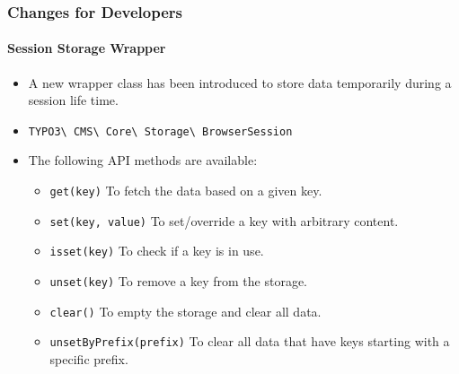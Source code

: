 %

\begin{frame}[fragile]
	\frametitle{Changes for Developers}
	\framesubtitle{Session Storage Wrapper}


	\begin{itemize}
		\item A new wrapper class has been introduced to store data temporarily
			during a session life time.
		\item \texttt{TYPO3\textbackslash
			CMS\textbackslash
			Core\textbackslash
			Storage\textbackslash
			BrowserSession}
		\item The following API methods are available:

			\begin{itemize}\smaller
				\item \texttt{get(key)}\newline
					To fetch the data based on a given key.
				\item \texttt{set(key, value)}\newline
					To set/override a key with arbitrary content.
				\item \texttt{isset(key)}\newline
					To check if a key is in use.
				\item \texttt{unset(key)}\newline
					To remove a key from the storage.
				\item \texttt{clear()}\newline
					To empty the storage and clear all data.
				\item \texttt{unsetByPrefix(prefix)}\newline
				 	To clear all data that have keys starting with a specific prefix.
			\end{itemize}\normalsize

	\end{itemize}

\end{frame}

